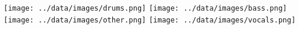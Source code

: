 \texttt{[image: ../data/images/drums.png]}
\texttt{[image: ../data/images/bass.png]}
\texttt{[image: ../data/images/other.png]}
\texttt{[image: ../data/images/vocals.png]}
